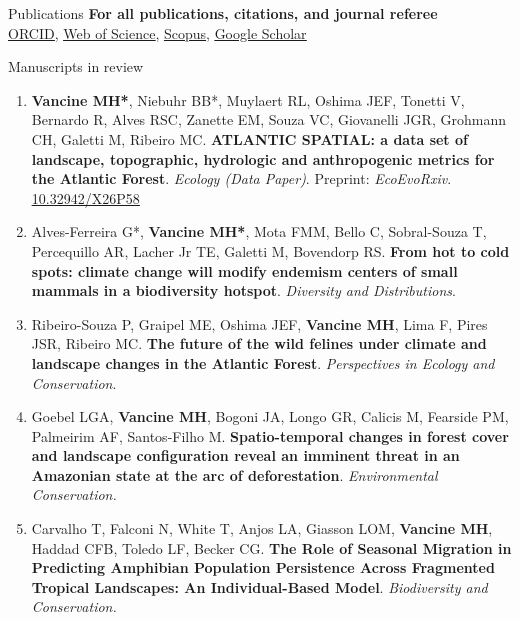 \documentclass{resume}
\begin{document}
\begin{rSection}{Publications}
{\bf For all publications, citations, and journal referee}
\\\href{https://orcid.org/0000-0001-9650-7575}{\underline{ORCID}}, \href{https://www.webofscience.com/wos/author/record/837504}{\underline{Web of Science}}, \href{https://www.scopus.com/authid/detail.uri?authorId=57193451888}{\underline{Scopus}}, \href{https://scholar.google.com/citations?user=i-2xZBQAAAAJ}{\underline{Google Scholar}}

\end{rSection}


\begin{rSection}{Manuscripts in review}

\begin{enumerate} 

\item {\bf Vancine MH*}, Niebuhr BB*, Muylaert RL, Oshima JEF, Tonetti V, Bernardo R, Alves RSC, Zanette EM, Souza VC, Giovanelli JGR, Grohmann CH, Galetti M, Ribeiro MC. {\bf ATLANTIC  SPATIAL:  a  data  set  of  landscape,  topographic,  hydrologic  and  anthropogenic metrics for the Atlantic Forest}. {\it Ecology (Data Paper)}. Preprint: {\it EcoEvoRxiv}. \href{https://doi.org/10.32942/X26P58}{\underline{10.32942/X26P58}}

\item Alves-Ferreira G*, {\bf Vancine MH*}, Mota FMM, Bello C, Sobral-Souza T, Percequillo AR, Lacher Jr TE, Galetti M, Bovendorp RS. {\bf From hot to cold spots: climate change will modify endemism centers of small mammals in a biodiversity hotspot}. {\it Diversity and Distributions}.

\item Ribeiro-Souza P, Graipel ME, Oshima JEF, {\bf Vancine MH}, Lima F, Pires JSR, Ribeiro MC. {\bf The future of the wild felines under climate and landscape changes in the Atlantic Forest}. {\it Perspectives in Ecology and Conservation}.

\item Goebel LGA, {\bf Vancine MH}, Bogoni JA, Longo GR, Calicis M, Fearside PM, Palmeirim AF, Santos-Filho M. {\bf Spatio-temporal changes in forest cover and landscape configuration reveal an imminent threat in an Amazonian state at the arc of deforestation}. {\it Environmental Conservation.}

\item Carvalho T, Falconi N, White T, Anjos LA, Giasson LOM, {\bf Vancine MH}, Haddad CFB, Toledo LF, Becker CG. {\bf The Role of Seasonal Migration in Predicting Amphibian Population Persistence Across Fragmented Tropical Landscapes: An Individual-Based Model}. {\it Biodiversity and Conservation.}


\end{enumerate}
\end{rSection}
\end{document}
